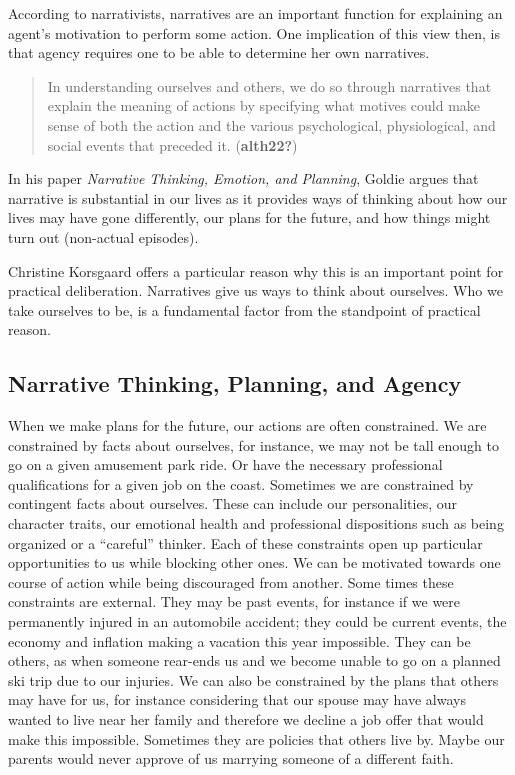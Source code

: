 \documentclass[
]{article}
\begin{document}
According to narrativists, narratives are an important function for
explaining an agent's motivation to perform some action. One implication
of this view then, is that agency requires one to be able to determine
her own narratives.

\begin{quote}
In understanding ourselves and others, we do so through narratives that
explain the meaning of actions by specifying what motives could make
sense of both the action and the various psychological, physiological,
and social events that preceded it. (\textbf{alth22?})
\end{quote}

In his paper \emph{Narrative Thinking, Emotion, and Planning}, Goldie
argues that narrative is substantial in our lives as it provides ways of
thinking about how our lives may have gone differently, our plans for
the future, and how things might turn out (non-actual episodes).

Christine Korsgaard offers a particular reason why this is an important
point for practical deliberation. Narratives give us ways to think about
ourselves. Who we take ourselves to be, is a fundamental factor from the
standpoint of practical reason.

\hypertarget{narrative-thinking-planning-and-agency}{%
\subsection{Narrative Thinking, Planning, and
Agency}\label{narrative-thinking-planning-and-agency}}

When we make plans for the future, our actions are often constrained. We
are constrained by facts about ourselves, for instance, we may not be
tall enough to go on a given amusement park ride. Or have the necessary
professional qualifications for a given job on the coast. Sometimes we
are constrained by contingent facts about ourselves. These can include
our personalities, our character traits, our emotional health and
professional dispositions such as being organized or a ``careful''
thinker. Each of these constraints open up particular opportunities to
us while blocking other ones. We can be motivated towards one course of
action while being discouraged from another. Some times these
constraints are external. They may be past events, for instance if we
were permanently injured in an automobile accident; they could be
current events, the economy and inflation making a vacation this year
impossible. They can be others, as when someone rear-ends us and we
become unable to go on a planned ski trip due to our injuries. We can
also be constrained by the plans that others may have for us, for
instance considering that our spouse may have always wanted to live near
her family and therefore we decline a job offer that would make this
impossible. Sometimes they are policies that others live by. Maybe our
parents would never approve of us marrying someone of a different faith.
\end{document}
